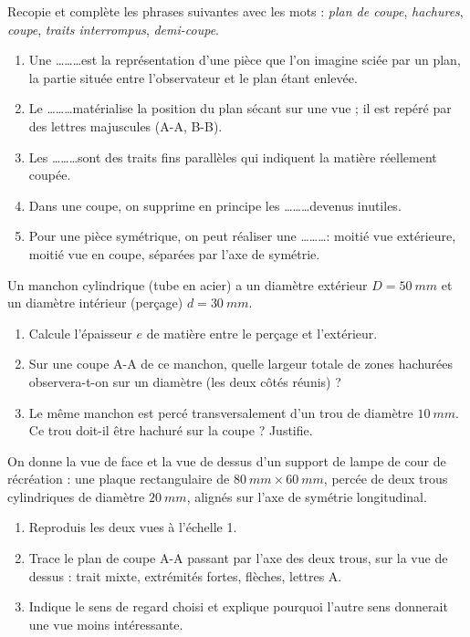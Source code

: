 \documentclass[11pt]{article}
\newcounter{popsec}
\newcounter{popsub}
\newcommand{\courssub}[1]{%
  \stepcounter{popsub}%
  \par\vspace{9pt}\noindent{\popxbold\fontsize{11.5}{13}\selectfont\color{popink}{\color{poporange}\thepopsec.\thepopsub}\hspace{6pt}#1}\par\nopagebreak\vspace{4pt}
}
\begin{document}
\begin{exercice}
Recopie et complète les phrases suivantes avec les mots : \emph{plan de coupe}, \emph{hachures}, \emph{coupe}, \emph{traits interrompus}, \emph{demi-coupe}.
\begin{enumerate}
\item Une \ldots\ldots\ldots est la représentation d'une pièce que l'on imagine sciée par un plan, la partie située entre l'observateur et le plan étant enlevée.
\item Le \ldots\ldots\ldots matérialise la position du plan sécant sur une vue ; il est repéré par des lettres majuscules (A-A, B-B).
\item Les \ldots\ldots\ldots sont des traits fins parallèles qui indiquent la matière réellement coupée.
\item Dans une coupe, on supprime en principe les \ldots\ldots\ldots devenus inutiles.
\item Pour une pièce symétrique, on peut réaliser une \ldots\ldots\ldots : moitié vue extérieure, moitié vue en coupe, séparées par l'axe de symétrie.
\end{enumerate}
\end{exercice}

\begin{exercice}
Un manchon cylindrique (tube en acier) a un diamètre extérieur $D = \SI{50}{mm}$ et un diamètre intérieur (perçage) $d = \SI{30}{mm}$.
\begin{enumerate}
\item Calcule l'épaisseur $e$ de matière entre le perçage et l'extérieur.
\item Sur une coupe A-A de ce manchon, quelle largeur totale de zones hachurées observera-t-on sur un diamètre (les deux côtés réunis) ?
\item Le même manchon est percé transversalement d'un trou de diamètre $\SI{10}{mm}$. Ce trou doit-il être hachuré sur la coupe ? Justifie.
\end{enumerate}
\end{exercice}

\courssub{Je m'entraîne}

\begin{exercice}
On donne la vue de face et la vue de dessus d'un support de lampe de cour de récréation : une plaque rectangulaire de $\SI{80}{mm} \times \SI{60}{mm}$, percée de deux trous cylindriques de diamètre $\SI{20}{mm}$, alignés sur l'axe de symétrie longitudinal.
\begin{enumerate}
\item Reproduis les deux vues à l'échelle 1.
\item Trace le plan de coupe A-A passant par l'axe des deux trous, sur la vue de dessus : trait mixte, extrémités fortes, flèches, lettres A.
\item Indique le sens de regard choisi et explique pourquoi l'autre sens donnerait une vue moins intéressante.
\end{enumerate}
\end{exercice}
\end{document}
